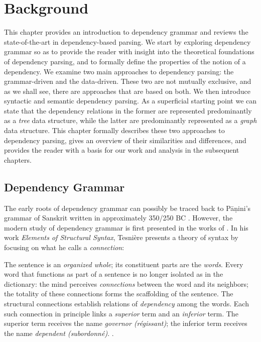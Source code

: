 \chapter{Background}
\label{chap:background}

This chapter provides an introduction to dependency grammar and reviews the state-of-the-art in dependency-based parsing. We start by exploring dependency grammar so as to provide the reader with insight into the theoretical foundations of dependency parsing, and to formally define the properties of the notion of a dependency. We examine two main approaches to dependency parsing: the grammar-driven and the data-driven. These two are not mutually exclusive, and as we shall see, there are approaches that are based on both. We then introduce syntactic and semantic dependency parsing. As a superficial starting point we can state that the dependency relations in the former are represented predominantly as a \textit{tree} data structure, while the latter are predominantly represented as a \textit{graph} data structure. This chapter formally describes these two approaches  to dependency parsing, gives an overview of their similarities and differences, and provides the reader with a basis for our work and analysis in the subsequent chapters.

\section{Dependency Grammar}
The early roots of dependency grammar can possibly be traced back to P\={a}\d{n}ini's grammar of Sanskrit written in approximately 350/250 BC \cite{Kruijff:02}. However, the modern study of  dependency grammar is first presented in the works of . In his work \textit{Elements of Structural Syntax}, Tesni\`{e}re presents a theory of syntax by focusing on what he calls a \textit{connection}:

\begin{displayquote}
The sentence is an \textit{organized whole}; its constituent parts are the \textit{words}. Every word that functions as part of a sentence is no longer isolated as in the dictionary: the mind perceives \textit{connections} between the word and its neighbors;  the totality of these connections forms the scaffolding of the sentence. The structural connections establish relations of \textit{dependency} among the words. Each such connection in principle links a \textit{superior} term and an \textit{inferior} term. The superior term receives the name \textit{governor (r\'{e}gissant)}; the inferior term receives the name \textit{dependent (subordonn\'{e})}. \cite{Tes:15}.
\end{displayquote}

